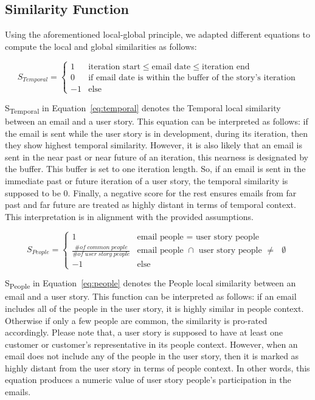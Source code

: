 \subsection{Similarity Function}
\label{sec:equations}
Using the aforementioned local-global principle, we adapted different equations to compute the local and global similarities as follows:

\begin{equation}
\label{eq:temporal}
S_{Temporal} =
\begin{cases}
1 & \mbox{iteration start} \le \mbox{email date} \le \mbox{iteration end}\\
0 & \mbox{if email date is within the buffer of the story's iteration} \\
-1 & \mbox{else}
\end{cases}
\end{equation}

S\textsubscript{Temporal} in Equation~\ref{eq:temporal} denotes the Temporal local similarity between an email and a user story. This equation can be interpreted as follows: if the email is sent while the user story is in development, during its iteration, then they show highest temporal similarity. However, it is also likely that an email is sent in the near past or near future of an iteration, this nearness is designated by the buffer. This buffer is set to one iteration length. So, if an email is sent in the immediate past or future iteration of a user story, the temporal similarity is supposed to be 0. Finally, a negative score for the rest ensures emails from far past and far future are treated as highly distant in terms of temporal context. This interpretation is in alignment with the provided assumptions.

\begin{equation}
\label{eq:people}
S_{People} =
\begin{cases}
1 & \mbox{email people = user story people}\\
\frac{\# of \; common \; people}{\# of \;user \;story \;people} & \mbox{email people $\cap$ user story people $\neq$ $\emptyset$} \\
-1 & \mbox{else}
\end{cases}
\end{equation}

S\textsubscript{People} in Equation~\ref{eq:people} denotes the People local similarity between an email and a user story. This function can be interpreted as follows: if an email includes all of the people in the user story, it is highly similar in people context. Otherwise if only a few people are common, the similarity is pro-rated accordingly. Please note that, a user story is supposed to have at least one customer or customer's representative in its people context. However, when an email does not include any of the people in the user story, then it is marked as highly distant from the user story in terms of people context. In other words, this equation produces a numeric value of user story people's participation in the emails.


